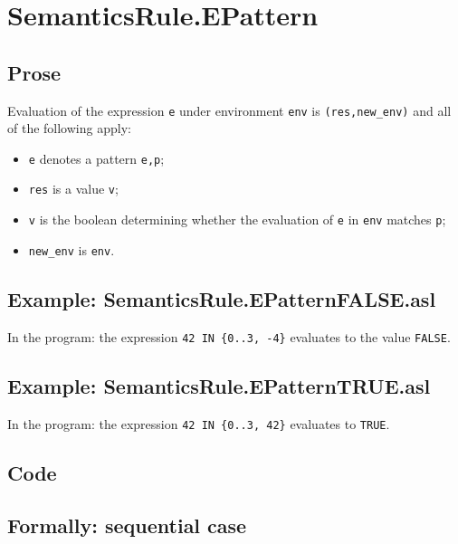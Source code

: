\documentclass{book}
\begin{document}
\section{SemanticsRule.EPattern \label{sec:SemanticsRule.EPattern}}


  \subsection{Prose}
  Evaluation of the expression \texttt{e} under environment \texttt{env} is
  \texttt{(res,new\_env)} and all of the following apply:
  \begin{itemize}
  \item \texttt{e} denotes a pattern \texttt{e,p};
  \item \texttt{res} is a value \texttt{v};
  \item \texttt{v} is the boolean determining whether the evaluation of \texttt{e} in \texttt{env} matches \texttt{p};
  \item \texttt{new\_env} is \texttt{env}.
  \end{itemize}

  \subsection{Example: SemanticsRule.EPatternFALSE.asl}
    In the program:
    the expression \texttt{42 IN \{0..3, -4\}} evaluates to the value \texttt{FALSE}.

  \subsection{Example: SemanticsRule.EPatternTRUE.asl}
    In the program:
    the expression \texttt{42 IN \{0..3, 42\}} evaluates to \texttt{TRUE}.

  \subsection{Code}

  \subsection{Formally: sequential case}
  \begin{align}
  \end{align} 
\end{document}
